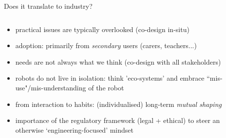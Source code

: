 \documentclass[xcolor=table,aspectratio=169]{beamer}
\begin{document}

\begin{frame}{Does it translate to industry?}
    \begin{columns}
        \begin{column}{0.7\linewidth}
            \begin{itemize}
                \item<+-> practical issues are typically overlooked (co-design
                    in-situ)
                 \item<+-> adoption: primarily from \emph{secondary} users (carers,
                    teachers...)
                \item<+-> needs are not always what we think (co-design with all
                    stakeholders)
                \item<+-> robots do not live in isolation: think 'eco-systems'
                    and embrace ``mis-use"/mis-understanding of the robot
                \item<+-> from interaction to habits: (individualised) long-term
                    \emph{mutual shaping}
                \item<+-> importance of the regulatory framework (legal +
                    ethical) to steer an
                    otherwise `engineering-focused' mindset


\end{itemize}
\end{column}
\end{columns}
\end{frame}
\end{document}
